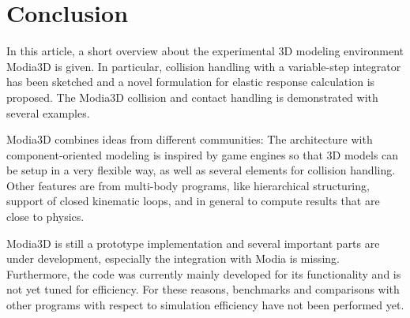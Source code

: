 \section{Conclusion}\label{sec:conclusion}
In this article, a short overview about the experimental 3D modeling environment Modia3D is given.
In particular, collision handling with a variable-step integrator has been sketched
and a novel formulation for elastic response calculation is proposed.
The Modia3D collision and contact handling is demonstrated with several examples. 

Modia3D combines ideas from different communities: The architecture with component-oriented modeling
is inspired by game engines so that 3D models can be setup in a very flexible way, as well as several elements for collision handling.
Other features are from multi-body programs, like hierarchical structuring, support of closed kinematic loops, and in general to compute results that are close to physics.

Modia3D is still a prototype implementation and several important parts are under development, especially the integration with Modia is missing. Furthermore, the code was currently mainly developed for its functionality and is not yet tuned for efficiency. For these reasons,
benchmarks and comparisons with other programs with respect to
simulation efficiency have not been performed yet.
